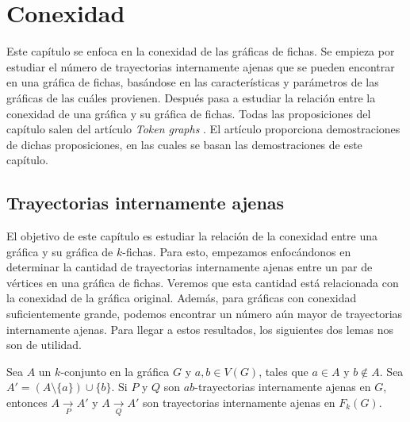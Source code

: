 \chapter{Conexidad}%
\label{cap:conexidad}

Este cap\'itulo se enfoca en la conexidad de las gr\'aficas de fichas. Se
empieza por estudiar el n\'umero de trayectorias internamente ajenas que se
pueden encontrar en una gr\'afica de fichas, bas\'andose en las
caracter\'isticas y par\'ametros de las gr\'aficas de las cu\'ales provienen.
Despu\'es pasa a estudiar la relaci\'on entre la conexidad de una gr\'afica y su
gr\'afica de fichas. Todas las proposiciones del cap\'itulo salen del art\'iculo
\textit{Token graphs} \cite{fabilaToken}. El art\'iculo proporciona
demostraciones de dichas proposiciones, en las cuales se basan las
demostraciones de este cap\'itulo.


\section{Trayectorias internamente ajenas}%
\label{sec:TrayIntAj}

El objetivo de este cap\'itulo es estudiar la relaci\'on de la conexidad entre
una gr\'afica y su gr\'afica de $k$-fichas. Para esto, empezamos enfoc\'andonos
en determinar la cantidad de trayectorias internamente ajenas entre un par de
v\'ertices en una gr\'afica de fichas. Veremos que esta cantidad est\'a
relacionada con la conexidad de la gr\'afica original. Adem\'as, para gr\'aficas
con conexidad suficientemente grande, podemos encontrar un n\'umero a\'un mayor
de trayectorias internamente ajenas. Para llegar a estos resultados, los
siguientes dos lemas nos son de utilidad.

\begin{lema}%
\label{lem:TrayIntAj-G-FG}
    Sea $A$ un $k$-conjunto en la gr\'afica $G$ y $a, b \in V(G)$, tales que $a
    \in A$ y $b \notin A$. Sea $A' = (A \setminus \{ a \}) \cup \{ b \}$. Si $P$
    y $Q$ son $ab$-trayectorias internamente ajenas en $G$, entonces $A
    \xrightarrow[P]{} A'$ y $A \xrightarrow[Q]{} A'$ son trayectorias
    internamente ajenas en $F_{k}(G)$.
\end{lema}

